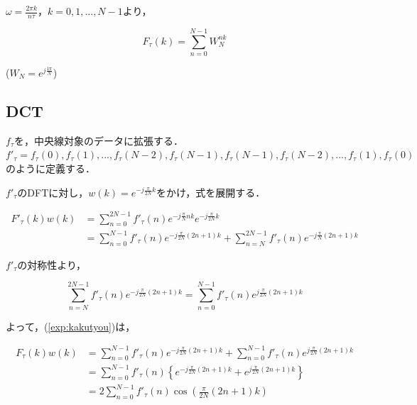 \documentclass[uplatex,dvipdfmx,ja=standard]{bxjsarticle}
\begin{document}
$\omega = \frac{2 \pi k}{n \tau}$，$k = 0,1,...,N-1$より，

\begin{equation}
    \label{exp:dft}
    F_{\tau} (k) = \sum_{n=0}^{N-1} W_N ^{nk}
\end{equation}
\begin{center}
    ($W_N = e^{j \frac{1 \pi }{N}} $)
\end{center}



\subsection{DCT}

$f_{\tau}$を，中央線対象のデータに拡張する．
$f'_{\tau} = f_{\tau}(0),f_{\tau}(1),...,f_{\tau}(N-2),f_{\tau}(N-1),f_{\tau}(N-1),f_{\tau}(N-2),...,f_{\tau}(1),f_{\tau}(0)$ 
のように定義する．

$f'_{\tau}$のDFTに対し，$w(k) = e^{-j\frac{\pi }{2N}k}$をかけ，式を展開する．

\begin{equation}
    \label{exp:kakutyou}
    \begin{split}
        F'_{\tau}(k)w(k) &= \sum_{n=0}^{2N-1} f'_{\tau}(n) e^{-j\frac{\pi}{N} nk } e^{-j \frac{\pi}{2N}k} \\
                         &= \sum_{n=0}^{N-1} f'_{\tau}(n) e^{-j\frac{\pi}{2N}(2n + 1)k } + \sum_{n=N}^{2N-1} f'_{\tau}(n) e^{-j \frac{\pi}{N}(2n + 1)k}
\end{split}
\end{equation}

\newpage

$f'_{\tau}$の対称性より，

\begin{equation}
    \sum_{n=N}^{2N-1} f'_{\tau}(n) e^{-j\frac{\pi}{2N}(2n + 1)k} = \sum_{n=0}^{N -1} f'_{\tau}(n) e^{j\frac{\pi}{2N}(2n + 1)k}
\end{equation}

よって，(\ref{exp:kakutyou})は，

\begin{equation}
    \begin{split}
        F_{\tau}(k) w(k) &= \sum_{n=0}^{N-1}f'_{\tau}(n) e^{-j\frac{\pi}{2N}(2n+1)k} + \sum_{n=0}^{N-1} f'_{\tau}(n) e^{j\frac{\pi}{2N}(2n+1)k} \\
                         &= \sum_{n=0}^{N-1} f'_{\tau} (n) \left\{e^{-j \frac{\pi}{2N}(2n+1)k} + e^{j \frac{\pi}{2N}(2n+1)k} \right\} \\
                         &= 2 \sum_{n=0}^{N-1} f'_{\tau}(n) \cos{\left( \frac{\pi}{2N} (2n+1)k \right)} 
    \end{split}
\end{equation}
\end{document}
